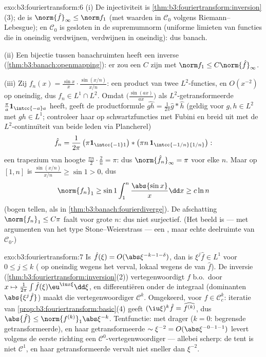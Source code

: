 \begin{solution}{exo:b3:fouriertransform:6}
(i) De injectiviteit is
\cref{thm:b3:fouriertransform:inversion}(3); de  is
$\norm{\hat f}_\infty \leq \norm f_1$ (met waarden in $\mathcal
C_0$ volgens Riemann--Lebesgue); en $\mathcal C_0$ is gesloten in
de supremumnorm (uniforme limieten van functies die in oneindig
verdwijnen, verdwijnen in oneindig): dus banach.

(ii) Een  bijectie tussen banachruimten heeft een
 inverse (\cref{thm:b3:banach:openmapping}): er zou een
$C$ zijn met $\norm f_1 \leq C\norm{\hat f}_\infty$.

(iii) Zij $f_n(x) = \frac{\sin x}x\cdot\frac{\sin(x/n)}{x/n}$:
een product van twee $L^2$-functies, en $O(x^{-2})$ op oneindig,
dus $f_n \in L^1\cap L^2$. Omdat
$\bigl(\frac{\sin(ax)}{ax}\bigr)$ als $L^2$-getransformeerde
$\frac\pi a\mathbf 1_{\intcc{-a}a}$ heeft, geeft de
productformule $\widehat{gh} = \frac1{2\pi}\hat g * \hat h$
(geldig voor $g, h \in L^2$ met $gh \in L^1$; controleer haar op
schwartzfuncties met Fubini en breid uit met de $L^2$-continuïteit
van beide leden via Plancherel)
\[
\hat f_n = \frac1{2\pi}\,\bigl(\pi\mathbf
1_{\intcc{-1}1}\bigr) * \bigl(\pi n\,\mathbf
1_{\intcc{-1/n}{1/n}}\bigr):
\]
een trapezium van hoogte $\frac{\pi n}2\cdot\frac2n = \pi$: dus
$\norm{\hat f_n}_\infty = \pi$ voor elke $n$. Maar op $[1, n]$ is
$\frac{\sin(x/n)}{x/n} \geq \sin 1 > 0$, dus
\[
\norm{f_n}_1 \geq \sin 1\int_1^n\frac{\abs{\sin x}}x\dd x
\geq c\ln n
\]
(bogen tellen, als in \cref{thm:b3:banach:fourierdiverge}). De
afschatting $\norm{f_n}_1 \leq C\pi$ faalt voor grote $n$: dus
niet surjectief. (Het beeld is --- met argumenten van het type
Stone--Weierstrass --- een , maar echte deelruimte van
$\mathcal C_0$.)
\end{solution}

\begin{solution}{exo:b3:fouriertransform:7}
Is $\hat f(\xi) = O(\abs\xi^{-k-1-\delta})$, dan is $\xi^j\hat f
\in L^1$ voor $0 \leq j \leq k$ ( op oneindig wegens
het verval, lokaal wegens de  van $\hat f$). De
inversie (\cref{thm:b3:fouriertransform:inversion}(2))
vertegenwoordigt $f$ b.o.\ door $x \mapsto \frac1{2\pi}\int\hat
f(\xi)\eu^{\iu x\xi}\dd\xi$, en differentiëren onder de integraal
(dominanten $\abs{\xi^j\hat f}$) maakt die vertegenwoordiger
$\mathcal C^k$. Omgekeerd, voor $f \in \mathcal C_c^k$: iteratie
van \cref{prop:b3:fouriertransform:basic}(4) geeft
$(\iu\xi)^k\hat f = \widehat{f^{(k)}}$, dus $\abs{\hat f} \leq
\norm{f^{(k)}}_1\abs\xi^{-k}$. Tentfunctie:  met 
drager ($k = 0$: begrensde getransformeerde), en haar
getransformeerde $\sim \xi^{-2} = O(\abs\xi^{-0-1-1})$ levert
volgens de eerste richting een $\mathcal
C^0$-vertegenwoordiger --- allebei scherp: de tent is niet
$\mathcal C^1$, en haar getransformeerde vervalt niet sneller dan
$\xi^{-2}$.
\end{solution}

